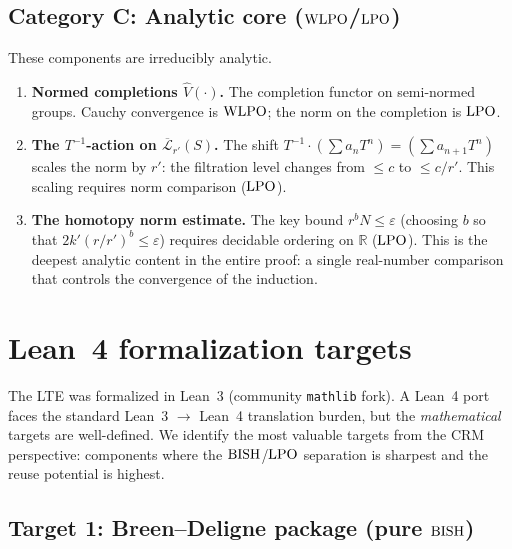 \documentclass[11pt,a4paper]{article}
\theoremstyle{plain}
\theoremstyle{definition}
\newcommand{\BISH}{\textup{BISH}}
\newcommand{\WLPO}{\textup{WLPO}}
\newcommand{\LPO}{\textup{LPO}}
\newcommand{\R}{\mathbb{R}}
\begin{document}
\subsection{Category C: Analytic core ($\WLPO$/$\LPO$)}

These components are irreducibly analytic.

\begin{enumerate}[nosep]
\item \textbf{Normed completions $\widehat{V}(\cdot)$.}
  The completion functor on semi-normed groups.  Cauchy
  convergence is $\WLPO$; the norm on the completion is $\LPO$.

\item \textbf{The $T^{-1}$-action on $\overline{\mathcal{L}}_{r'}(S)$.}
  The shift $T^{-1} \cdot (\sum a_n T^n) = (\sum a_{n+1} T^n)$
  scales the norm by $r'$: the filtration level changes from
  $\leq c$ to $\leq c/r'$.  This scaling requires norm
  comparison ($\LPO$).

\item \textbf{The homotopy norm estimate.}
  The key bound $r^b N \leq \varepsilon$ (choosing $b$ so that
  $2k'(r/r')^b \leq \varepsilon$) requires decidable ordering
  on $\R$ ($\LPO$).  This is the deepest analytic content in
  the entire proof: a single real-number comparison that
  controls the convergence of the induction.
\end{enumerate}

\section{Lean~4 formalization targets}\label{sec:lean4}

The LTE was formalized in Lean~3 (community \texttt{mathlib} fork).
A Lean~4 port faces the standard Lean~3 $\to$ Lean~4 translation
burden, but the \emph{mathematical} targets are well-defined.
We identify the most valuable targets from the CRM perspective:
components where the $\BISH$/$\LPO$ separation is sharpest and
the reuse potential is highest.

\subsection{Target 1: Breen--Deligne package (pure $\BISH$)}
\end{document}
